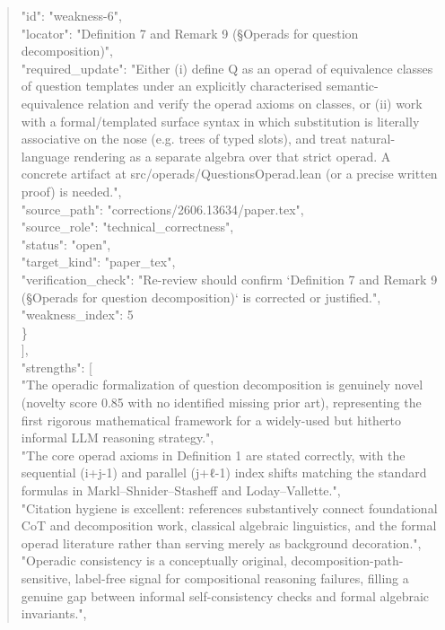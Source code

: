\documentclass[11pt]{article}
\begin{document}
\begin{quote}
      "id": "weakness-6",\\
      "locator": "Definition 7 and Remark 9 (§Operads for question decomposition)",\\
      "required\_update": "Either (i) define Q as an operad of equivalence classes of question templates under an explicitly characterised semantic-equivalence relation and verify the operad axioms on classes, or (ii) work with a formal/templated surface syntax in which substitution is literally associative on the nose (e.g. trees of typed slots), and treat natural-language rendering as a separate algebra over that strict operad. A concrete artifact at src/operads/QuestionsOperad.lean (or a precise written proof) is needed.",\\
      "source\_path": "corrections/2606.13634/paper.tex",\\
      "source\_role": "technical\_correctness",\\
      "status": "open",\\
      "target\_kind": "paper\_tex",\\
      "verification\_check": "Re-review should confirm `Definition 7 and Remark 9 (§Operads for question decomposition)` is corrected or justified.",\\
      "weakness\_index": 5\\
    \}\\
  ],\\
  "strengths": [\\
    "The operadic formalization of question decomposition is genuinely novel (novelty score 0.85 with no identified missing prior art), representing the first rigorous mathematical framework for a widely-used but hitherto informal LLM reasoning strategy.",\\
    "The core operad axioms in Definition 1 are stated correctly, with the sequential (i+j-1) and parallel (j+ℓ-1) index shifts matching the standard formulas in Markl--Shnider--Stasheff and Loday--Vallette.",\\
    "Citation hygiene is excellent: references substantively connect foundational CoT and decomposition work, classical algebraic linguistics, and the formal operad literature rather than serving merely as background decoration.",\\
    "Operadic consistency is a conceptually original, decomposition-path-sensitive, label-free signal for compositional reasoning failures, filling a genuine gap between informal self-consistency checks and formal algebraic invariants.",\\

\end{quote}
\end{document}
